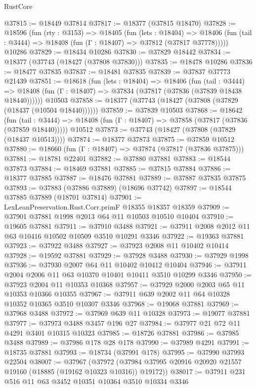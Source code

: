 \begin{lexlean}{RustCore}
\begin{coremodule}
@37815 := @18449 @37814
@37817 := @18377 (@37815 @18470)
@37828 := @18596
    (fun (rty : @3153) =>
    @18405
      (fun (lets : @18404) =>
      @18406 (fun (tail : @3444) => @18408 (fun (Γ : @18407) => @37812 (@37817 @37778)))))
    @10286
@37829 := @18434 @10286
@37830 := @37829 @18442
@37834 := @18377 (@37743 (@18427 (@37808 @37830)))
@37835 := @18478 @10286
@37836 := @18477 @37835
@37837 := @18481 @37835
@37839 := @37837 @37773 @21439
@37851 := @18618
    (fun (lets : @18404) =>
    @18406
      (fun (tail : @3444) =>
      @18408 (fun (Γ : @18407) => @37834 (@37817 (@37836 (@37839 @18438 @18440))))))
    @10503
@37858 := @18377 (@37743 (@18427 (@37808 (@37829 (@18437 (@10504 @18440))))))
@37859 := @37839 @10503
@37868 := @18642
    (fun (tail : @3444) => @18408 (fun (Γ : @18407) => @37858 (@37817 (@37836 (@37859 @18440)))))
    @10512
@37873 := @37743 (@18427 (@37808 (@37829 (@18437 @10513))))
@37874 := @18377 @37873
@37875 := @37859 @10512
@37880 := @18660 (fun (Γ : @18407) => @37874 (@37817 (@37836 @37875)))
@37881 := @18781 @22401
@37882 := @37880 @37881
@37883 := @18544 @37873
@37884 := @18469 @37881
@37885 := @37815 @37884
@37886 := @18377 @37885
@37887 := @18476 @37881
@37889 := @37887 @37835 @37875
@37893 := @37883 (@37886 @37889) (@18696 @37742)
@37897 := @18544 @37885 @37889 (@18701 @37814)
@37901 := LexLeanPreservation.Rust.Corr.primF @18355 @18357 @18359
@37909 := @37901 @37881 @1998 @2013 @64 @11 @10503 @10510 @10404
@37910 := @19605 @37881
@37911 := @37910 @3488
@37921 := @37911 @2008 @2012 @11 @63 @10416 @10502 @10509 @3510 @10291 @3346
@37922 := @19363 @37881
@37923 := @37922 @3488
@37927 := @37923 @2008 @11 @10402 @10414
@37928 := @19592 @37881
@37929 := @37928 @3488
@37930 := @37929 @1998
@37936 := @37930 @2007 @64 @11 @10402 @10412 @10404
@37946 := @37911 @2004 @2006 @11 @63 @10370 @10401 @10411 @3510 @10299 @3346
@37950 := @37923 @2004 @11 @10353 @10368
@37957 := @37929 @2000 @2003 @65 @11 @10353 @10366 @10355
@37967 := @37911 @639 @2002 @11 @64 @10328 @10352 @10365 @3510 @10307 @3346
@37968 := @19068 @37881
@37969 := @37968 @3488
@37972 := @37969 @639 @11 @10328
@37973 := @19077 @37881
@37977 := @37973 @3488 @3457 @196 @27
@37984 := @37977 @21 @72 @11 @4291 @3401 @10315 @10323
@37985 := @18726 @37881
@37986 := @37985 @3488
@37989 := @37986 @178 @28 @178
@37990 := @37989 @4291
@37991 := @18735 @37881
@37993 := @18734 (@37991 @178)
@37995 := @37990 @37993 @22504
@38007 := @37967
    (@37972 (@37984 @37995 @20916 @20920 @21557 @19160 (@18885 (@19162 @10323 @10316)) @19172))
@38017 := @37911 @231 @516 @11 @63 @3452 @10351 @10364 @3510 @10334 @3346

\end{coremodule}
\end{lexlean}
